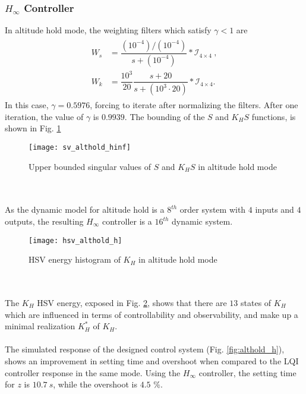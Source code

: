 \subsubsection{$H_\infty$ Controller}
In altitude hold mode, the weighting filters which satisfy $\gamma < 1$ are
\begin{align}
\begin{split}
W_{s} &= \dfrac{(10^{-4})/(10^{-4})}{s + (10^{-4})}*\mathcal{I}_{4\times 4}\ ,\\[5px]
W_{k} &= \dfrac{10^{3}}{20}\dfrac{s+20}{s+(10^{3}\cdot 20)}*\mathcal{I}_{4\times 4}.
\end{split}
\end{align}
In this case, $\gamma = 0.5976$, forcing to iterate after normalizing the filters. After one iteration, the value of $\gamma$ is $0.9939$. The bounding of the $S$ and $K_{H}S$ functions, is shown in Fig. \ref{fig:sv_althold_hinf}
\begin{figure}[h]
\begin{center}
\texttt{[image: sv\_althold\_hinf]}  
\caption{Upper bounded singular values of $S$ and $K_{H}S$ in altitude hold mode} 
\label{fig:sv_althold_hinf}
\end{center}
\end{figure}
\\\\As the dynamic model for altitude hold is a $8^{th}$ order system with $4$ inputs and $4$ outputs, the resulting $H_\infty$ controller is a $16^{th}$ dynamic system.
\begin{figure}[h]
\begin{center}
\texttt{[image: hsv\_althold\_h]}  
\caption{HSV energy histogram of $K_H$ in altitude hold mode} 
\label{fig:hsv_althold_h}
\end{center}
\end{figure}
\\\\The $K_H$ HSV energy, exposed in Fig. \ref{fig:hsv_althold_h}, shows that there are $13$ states of $K_H$ which are influenced in terms of controllability and observability, and make up a minimal realization $K_{H}^{*}$ of $K_H$.
\\\\
The simulated response of the designed control system (Fig. \ref{fig:althold_h}), shows an improvement in setting time and overshoot when compared to the LQI controller response in the same mode. Using the $H_\infty$ controller, the setting time for $z$ is $10.7\ s$, while the overshoot is $4.5$ \%.
 
